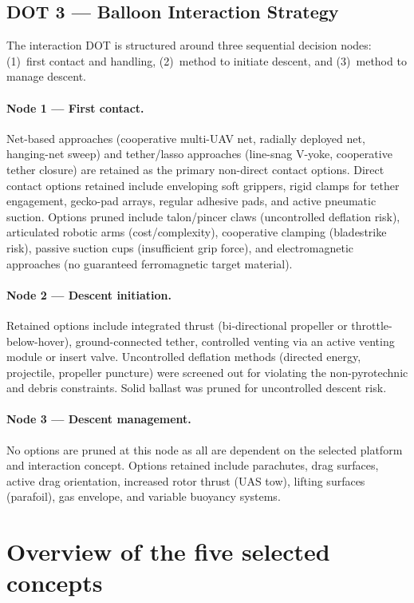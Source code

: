 \subsection*{DOT 3 — Balloon Interaction Strategy}
The interaction DOT is structured around three sequential
decision nodes: (1)~first contact and handling,
(2)~method to initiate descent, and (3)~method to manage
descent.

\paragraph{Node 1 — First contact.}
Net-based approaches (cooperative multi-UAV net, radially
deployed net, hanging-net sweep) and tether/lasso approaches
(line-snag V-yoke, cooperative tether closure) are retained
as the primary non-direct contact options. Direct contact
options retained include enveloping soft grippers, rigid
clamps for tether engagement, gecko-pad arrays, regular
adhesive pads, and active pneumatic suction. Options pruned
include talon/pincer claws (uncontrolled deflation risk),
articulated robotic arms (cost/complexity), cooperative
clamping (bladestrike risk), passive suction cups (insufficient grip force), and electromagnetic approaches (no guaranteed ferromagnetic target material).

\paragraph{Node 2 — Descent initiation.}
Retained options include integrated thrust (bi-directional
propeller or throttle-below-hover), ground-connected tether, controlled venting via an active venting module or insert valve. Uncontrolled deflation methods (directed energy, projectile, propeller puncture) were screened out for violating the non-pyrotechnic and debris constraints. Solid ballast was pruned for uncontrolled descent risk.

\paragraph{Node 3 — Descent management.}
No options are pruned at this node as all are dependent on
the selected platform and interaction concept. Options
retained include parachutes, drag surfaces, active drag
orientation, increased rotor thrust (UAS tow), lifting
surfaces (parafoil), gas envelope, and variable buoyancy
systems.


\section{Overview of the five selected concepts}


